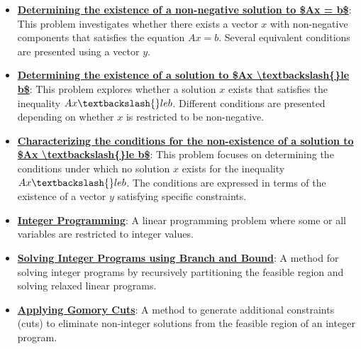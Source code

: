 \documentclass{article}%
\begin{document}
\begin{itemize}[leftmargin=*]%
\item \href{https://www.math.purdue.edu/~yipn/421/2024-10-28-Farkas.pdf#page=2}{\textbf{Determining the existence of a non{-}negative solution to \$Ax = b\$}}: This problem investigates whether there exists a vector $x$ with non-negative components that satisfies the equation $Ax = b$. Several equivalent conditions are presented using a vector $y$.%
\item \href{https://www.math.purdue.edu/~yipn/421/2024-10-28-Farkas.pdf#page=4}{\textbf{Determining the existence of a solution to \$Ax \textbackslash{}textbackslash\{\}le b\$}}: This problem explores whether a solution $x$ exists that satisfies the inequality $Ax \textbackslash{}le b$. Different conditions are presented depending on whether $x$ is restricted to be non-negative.%
\item \href{https://www.math.purdue.edu/~yipn/421/2024-10-28-Farkas.pdf#page=6}{\textbf{Characterizing the conditions for the non{-}existence of a solution to \$Ax \textbackslash{}textbackslash\{\}le b\$}}: This problem focuses on determining the conditions under which no solution $x$ exists for the inequality $Ax \textbackslash{}le b$. The conditions are expressed in terms of the existence of a vector $y$ satisfying specific constraints.%
\end{itemize}%
\begin{itemize}[leftmargin=*]%
\item \href{https://www.math.purdue.edu/~yipn/421/2024-10-31-IntLinProg.pdf#page=1}{\textbf{Integer Programming}}: A linear programming problem where some or all variables are restricted to integer values.%
\item \href{https://www.math.purdue.edu/~yipn/421/2024-10-31-IntLinProg.pdf#page=5}{\textbf{Solving Integer Programs using Branch and Bound}}: A method for solving integer programs by recursively partitioning the feasible region and solving relaxed linear programs.%
\item \href{https://www.math.purdue.edu/~yipn/421/2024-10-31-IntLinProg.pdf#page=15}{\textbf{Applying Gomory Cuts}}: A method to generate additional constraints (cuts) to eliminate non-integer solutions from the feasible region of an integer program.%
\end{itemize}%
\end{document}
